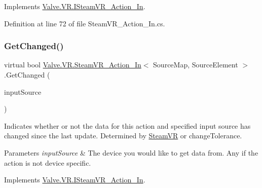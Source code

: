 Implements \mbox{\hyperlink{interface_valve_1_1_v_r_1_1_i_steam_v_r___action___in_ad0ed3e6765d11920e94e259f6ee6b7c4}{Valve.\+V\+R.\+I\+Steam\+V\+R\+\_\+\+Action\+\_\+\+In}}.



Definition at line 72 of file Steam\+V\+R\+\_\+\+Action\+\_\+\+In.\+cs.

\mbox{\label{class_valve_1_1_v_r_1_1_steam_v_r___action___in_ab5dff6e847415ea70581fb544443738d}} 
\subsubsection{\texorpdfstring{GetChanged()}{GetChanged()}}
{\footnotesize\ttfamily virtual bool \mbox{\hyperlink{class_valve_1_1_v_r_1_1_steam_v_r___action___in}{Valve.\+V\+R.\+Steam\+V\+R\+\_\+\+Action\+\_\+\+In}}$<$ Source\+Map, Source\+Element $>$.Get\+Changed (\begin{DoxyParamCaption}\item[{\mbox{\hyperlink{namespace_valve_1_1_v_r_a82e5bf501cc3aa155444ee3f0662853f}{Steam\+V\+R\+\_\+\+Input\+\_\+\+Sources}}}]{input\+Source }\end{DoxyParamCaption})\hspace{0.3cm}{\ttfamily [virtual]}}



Indicates whether or not the data for this action and specified input source has changed since the last update. Determined by \mbox{\hyperlink{class_valve_1_1_v_r_1_1_steam_v_r}{Steam\+VR}} or \textquotesingle{}change\+Tolerance\textquotesingle{}. 


\begin{DoxyParams}{Parameters}
{\em input\+Source} & The device you would like to get data from. Any if the action is not device specific.\\
\hline
\end{DoxyParams}


Implements \mbox{\hyperlink{interface_valve_1_1_v_r_1_1_i_steam_v_r___action___in_acfd82f764ece664bc376e638fe440dfd}{Valve.\+V\+R.\+I\+Steam\+V\+R\+\_\+\+Action\+\_\+\+In}}.




